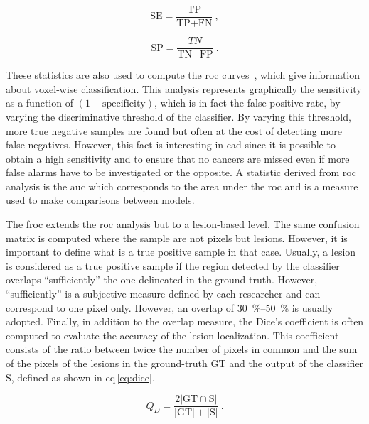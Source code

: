 \begin{equation}
  \text{SE} = \frac{\text{TP}}{\text{TP} + \text{FN}} \ ,
  \label{eq:sens}
\end{equation}

\begin{equation}
  \text{SP} = \frac{TN}{\text{TN} + \text{FP}} \ .
  \label{eq:spec}
\end{equation}

These statistics are also used to compute the \ac{roc} curves~\cite{Metz2006}, which give information about voxel-wise classification.
This analysis represents graphically the sensitivity as a function of $(1 - \text{specificity})$, which is in fact the false positive rate, by varying the discriminative threshold of the classifier.
By varying this threshold, more true negative samples are found but often at the cost of detecting more false negatives.
However, this fact is interesting in \ac{cad} since it is possible to obtain a high sensitivity and to ensure that no cancers are missed even if more false alarms have to be investigated or the opposite.
A statistic derived from \ac{roc} analysis is the \acf{auc} which corresponds to the area under the \ac{roc} and is a measure used to make comparisons between models.

The \acf{froc} extends the \ac{roc} analysis but to a lesion-based level.
The same confusion matrix is computed where the sample are not pixels but lesions.
However, it is important to define what is a true positive sample in that case.
Usually, a lesion is considered as a true positive sample if the region detected by the classifier overlaps ``sufficiently'' the one delineated in the ground-truth.
However, ``sufficiently'' is a subjective measure defined by each researcher and can correspond to one pixel only.
However, an overlap of \SIrange{30}{50}{\percent} is usually adopted.
Finally, in addition to the overlap measure, the Dice's coefficient is often computed to evaluate the accuracy of the lesion localization.
This coefficient consists of the ratio between twice the number of pixels in common and the sum of the pixels of the lesions in the ground-truth $\text{GT}$ and the output of the classifier $\text{S}$, defined as shown in \acs{eq}\,\eqref{eq:dice}.

\begin{equation}
  Q_D = \frac{2 | \text{GT} \cap \text{S} |}{| \text{GT} | + | \text{S} |} \ .
  \label{eq:dice}
\end{equation}
